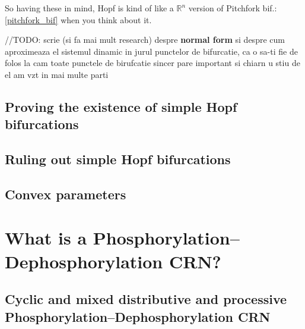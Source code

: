 So having these in mind, Hopf is kind of like a $\mathbb{R}^n$ version of Pitchfork bif.: \ref{pitchfork_bif} when you think about it.

//TODO: scrie (si fa mai mult research) despre  \textbf{normal form} si despre cum aproximeaza el sistemul dinamic in jurul punctelor de bifurcatie, ca o sa-ti fie de folos la cam toate punctele de birufcatie sincer pare important si chiarn u stiu de el am vzt in mai multe parti

\subsection{Proving the existence of simple Hopf bifurcations}

\subsection{Ruling out simple Hopf bifurcations}

\subsection{Convex parameters}

\section{What is a Phosphorylation–Dephosphorylation CRN?}

\subsection{Cyclic and mixed distributive and processive Phosphorylation–Dephosphorylation CRN}
